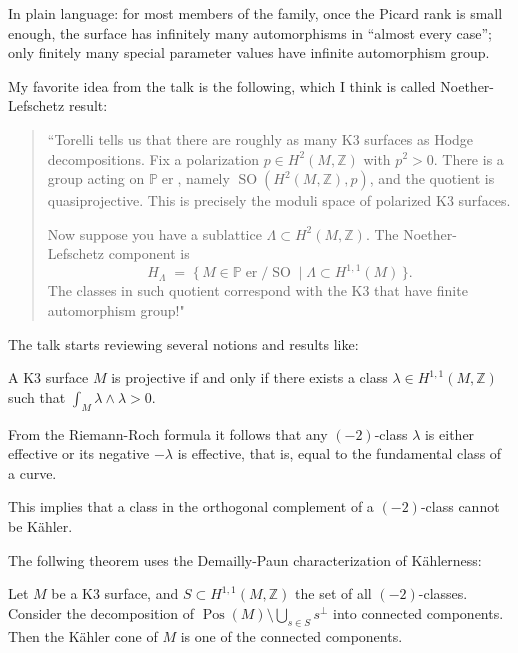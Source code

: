 In plain language: for most members of the
family, once the Picard rank is small enough,
the surface has infinitely many
automorphisms in ``almost every case'';
only finitely many special
parameter values have infinite automorphism
group.

My favorite idea from the talk is the
following, which I think is called
Noether-Lefschetz result:

\begin{quotation}
  ``Torelli tells us that there are roughly as many
K3 surfaces as Hodge decompositions. Fix a
polarization $p \in H^2(M,\mathbb{Z})$ with
$p^2>0$. There is a group acting on
$\mathbb{P}\operatorname{er}$, namely
$\operatorname{SO}(H^2(M,\mathbb{Z}),p)$, and the
quotient is quasiprojective. This is precisely the
moduli space of polarized K3 surfaces.

\noindent
Now suppose you have a sublattice
$\Lambda \subset H^2(M,\mathbb{Z})$. The
Noether-Lefschetz component is
\[
H_{\Lambda}
\;=\;
\{\,M \in \mathbb{P}\operatorname{er}/\operatorname{SO}
\mid \Lambda \subset H^{1,1}(M)\,\}.
\]
The classes in such quotient correspond
with the K3 that have finite automorphism
group!"
\end{quotation}


\medskip\noindent
The talk starts reviewing several notions
and results like:

\begin{theorem}
A K3 surface $M$ is projective if and only if
there exists a class $\lambda \in H^{1,1}(M,\mathbb{Z})$
such that $\int_M \lambda \wedge \lambda > 0$.
\end{theorem}

\begin{remark}
From the Riemann-Roch formula it follows that
any $(-2)$-class $\lambda$ is either effective or
its negative $-\lambda$ is effective, that is,
equal to the fundamental class of a curve.
\end{remark}

\begin{remark}
This implies that a class in the orthogonal
complement of a $(-2)$-class cannot be Kähler.
\end{remark}

\noindent
The follwing theorem uses the Demailly-Paun
characterization of Kählerness:

\begin{theorem}
Let $M$ be a K3 surface, and $S \subset
H^{1,1}(M,\mathbb{Z})$ the set of all
$(-2)$-classes. Consider the decomposition of
$\operatorname{Pos}(M) \setminus
\bigcup_{s\in S} s^\perp$ into connected
components. Then the Kähler cone of $M$ is one
of the connected components.
\end{theorem}


